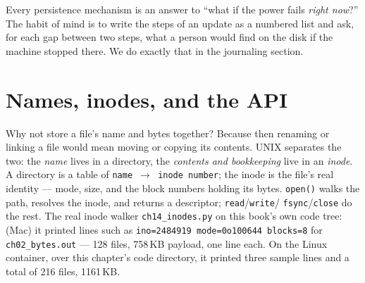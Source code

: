 \begin{principle}
Every persistence mechanism is an answer to ``what if the power fails
\emph{right now}?'' The habit of mind is to write the steps of an
update as a numbered list and ask, for each gap between two steps,
what a person would find on the disk if the machine stopped there. We
do exactly that in the journaling section.
\end{principle}

\section{Names, inodes, and the API}
\label{sec:inode14}

Why not store a file's name and bytes together? Because then
renaming or linking a file would mean moving or copying its contents.
UNIX separates the two: the \emph{name} lives in a directory, the
\emph{contents and bookkeeping} live in an \emph{inode}.
A directory is a table of \texttt{name $\to$ inode~number}; the
inode is the file's real identity --- mode, size, and the block
numbers holding its bytes. \texttt{open()} walks the path, resolves
the inode, and returns a descriptor; \texttt{read}/\texttt{write}/
\texttt{fsync}/\texttt{close} do the rest. The real inode walker
\texttt{ch14\_inodes.py} on this book's own code tree:
(Mac) it printed lines such as
\texttt{ino=2484919 mode=0o100644 blocks=8} for \texttt{ch02\_bytes.out} ---
128 files, 758\,KB payload, one line each. On the Linux container,
over this chapter's code directory, it printed three sample lines and
a total of 216 files, 1161\,KB.



